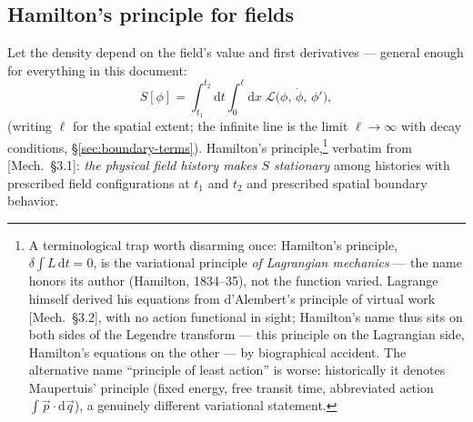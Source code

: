 \documentclass[11pt]{article}
\theoremstyle{plain}
\theoremstyle{definition}
\theoremstyle{remark}
\newcommand{\dd}{\mathrm{d}}
\newcommand{\vp}{\vec{p}}
\begin{document}
\subsection{Hamilton's principle for fields}
\label{sec:hamilton-fields}

Let the density depend on the field's value and first derivatives ---
general enough for everything in this document:
\begin{equation}
  S[\phi]
  = \int_{t_1}^{t_2}\!\dd t \int_0^{\ell}\!\dd x\;
    \mathcal L\bigl(\phi,\, \dot\phi,\, \phi'\bigr),
  \label{eq:field-action}
\end{equation}
(writing $\ell$ for the spatial extent; the infinite line is the limit
$\ell \to \infty$ with decay conditions, \S\ref{sec:boundary-terms}).
Hamilton's principle,\footnote{A terminological trap worth disarming
once: Hamilton's principle, $\delta\!\int\! L\,\dd t = 0$, is the
variational principle \emph{of Lagrangian mechanics} --- the name
honors its author (Hamilton, 1834--35), not the function varied.
Lagrange himself derived his equations from d'Alembert's principle of
virtual work [Mech.\ \S3.2], with no action functional in sight;
Hamilton's name thus sits on both sides of the Legendre transform ---
this principle on the Lagrangian side, Hamilton's equations on the
other --- by biographical accident. The alternative name ``principle
of least action'' is worse: historically it denotes Maupertuis'
principle (fixed energy, free transit time, abbreviated action
$\int \vp\cdot\dd\vec q$), a genuinely different variational statement.}
verbatim from [Mech.\ \S3.1]: \emph{the physical
field history makes $S$ stationary} among histories with prescribed
field configurations at $t_1$ and $t_2$ and prescribed spatial
boundary behavior.
\end{document}
